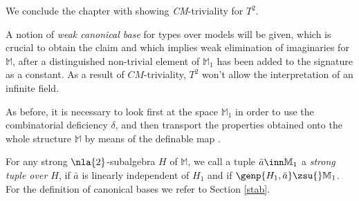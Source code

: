 \cbstart
We conclude the chapter with showing {\sl CM}-triviality for $T^{2}$.

A notion of {\em weak canonical base} for types over models will be given,
which is crucial to obtain the claim and which implies weak elimination of imaginaries for $\mathbb{M}$, after
a distinguished non-trivial element of $\mathbb{M}_{1}$ has been added to the signature as a constant.
As a result of $CM$-triviality, $T^{2}$ won't allow the interpretation of an infinite field.

As before, it is necessary to look first at the space $\mathbb{M}_{1}$
in order to use the combinatorial deficiency $\delta$, and then transport the properties obtained onto the whole structure
$\mathbb{M}$ by means of the definable map .

\medskip
For any strong $\nla{2}$-subalgebra $H$ of $\mathbb{M}$, we call a tuple $\bar a\inn\mathbb{M}_{1}$ a {\em strong tuple over $H$},
if $\bar a$ is linearly independent of $H_{1}$ and if $\genp{H_{1},\bar a}\zsu{}\mathbb{M}_{1}$. For the
definition of canonical bases we refer to Section \ref{stab}.

